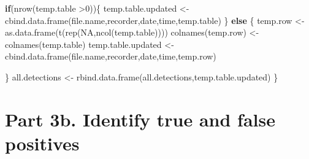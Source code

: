 \documentclass[
]{book}
\newenvironment{Shaded}{\begin{snugshade}}{\end{snugshade}}
\newcommand{\ControlFlowTok}[1]{\textcolor[rgb]{0.13,0.29,0.53}{\textbf{#1}}}
\newcommand{\DecValTok}[1]{\textcolor[rgb]{0.00,0.00,0.81}{#1}}
\newcommand{\FunctionTok}[1]{\textcolor[rgb]{0.00,0.00,0.00}{#1}}
\newcommand{\NormalTok}[1]{#1}
\newcommand{\OtherTok}[1]{\textcolor[rgb]{0.56,0.35,0.01}{#1}}
\newcommand{\SpecialCharTok}[1]{\textcolor[rgb]{0.00,0.00,0.00}{#1}}
\newcommand{\StringTok}[1]{\textcolor[rgb]{0.31,0.60,0.02}{#1}}
\begin{document}
\begin{Shaded}
\begin{Highlighting}[]
  \ControlFlowTok{if}\NormalTok{(}\FunctionTok{nrow}\NormalTok{(temp.table }\SpecialCharTok{\textgreater{}}\DecValTok{0}\NormalTok{))\{}
\NormalTok{    temp.table.updated }\OtherTok{\textless{}{-}} \FunctionTok{cbind.data.frame}\NormalTok{(file.name,recorder,date,time,temp.table)}
\NormalTok{  \} }\ControlFlowTok{else}\NormalTok{ \{}
\NormalTok{    temp.row }\OtherTok{\textless{}{-}} \FunctionTok{as.data.frame}\NormalTok{(}\FunctionTok{t}\NormalTok{(}\FunctionTok{rep}\NormalTok{(}\StringTok{\textquotesingle{}NA\textquotesingle{}}\NormalTok{,}\FunctionTok{ncol}\NormalTok{(temp.table))))}
    \FunctionTok{colnames}\NormalTok{(temp.row) }\OtherTok{\textless{}{-}} \FunctionTok{colnames}\NormalTok{(temp.table)}
\NormalTok{    temp.table.updated }\OtherTok{\textless{}{-}} \FunctionTok{cbind.data.frame}\NormalTok{(file.name,recorder,date,time,temp.row)}
    
\NormalTok{  \}}
\NormalTok{  all.detections }\OtherTok{\textless{}{-}} \FunctionTok{rbind.data.frame}\NormalTok{(all.detections,temp.table.updated)}
\NormalTok{\}}
\end{Highlighting}
\end{Shaded}

\hypertarget{part-3b.-identify-true-and-false-positives}{%
\section{Part 3b. Identify true and false positives}\label{part-3b.-identify-true-and-false-positives}}
\end{document}
